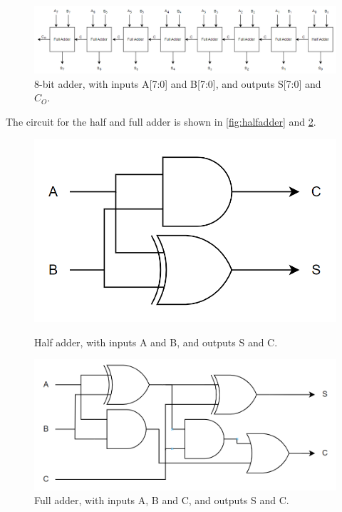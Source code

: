 \begin{figure}[H]
    \centering
    \includegraphics[width=\textwidth]{Figures/8bitadder.png}
    \caption{8-bit adder, with inputs A[7:0] and B[7:0], and outputs S[7:0] and $C_O$.}
    \label{fig:adder-blokk}
\end{figure}

The circuit for the half and full adder is shown in \autoref{fig:halfadder} and \ref{fig:fulladder}. 

\begin{figure}[H]
\begin{minipage}{0.4\textwidth}
    \centering
    \includegraphics[width=\linewidth]{Figures/halfadder.png}
    \caption{Half adder, with inputs A and B, and outputs S and C.}
    \label{fig:halfadder}
\end{minipage}
\begin{minipage}{0.6\textwidth}
    \centering
    \includegraphics[width=\linewidth]{Figures/fulladder.png}
    \caption{Full adder, with inputs A, B and C, and outputs S and C.}
    \label{fig:fulladder}
\end{minipage}
\end{figure}


